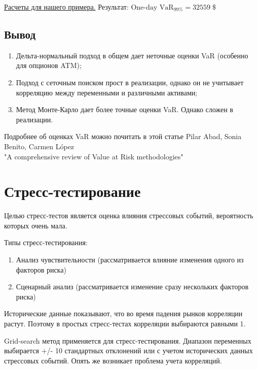 \documentclass{article}
\begin{document}
\href{https://youtu.be/ev2jSbH9G9U?t=3379}{Расчеты для нашего примера.} Результат: $\text{One-day } \text{VaR}_{99\%} = 32559 \;\$ $
\subsection{Вывод}
\begin{enumerate}
\item
Дельта-нормальный подход в общем дает
неточные оценки VaR (особенно для
опционов ATM);
\item
Подход с сеточным поиском прост в реализации,
однако он не учитывает корреляцию
между переменными и различными активами;
\item
Метод Монте-Карло дает более точные оценки
VaR. Однако сложен   в реализации.
\end{enumerate}
Подробнее об оценках VaR можно почитать в этой статье Pilar Abad, Sonia Benito, Carmen López \\"A comprehensive review of Value at Risk methodologies"  
\section{Стресс-тестирование}
Целью стресс-тестов является оценка влияния стрессовых событий, вероятность которых очень мала.

Типы стресс-тестирования:
\begin{enumerate}
\item
Анализ чувствительности (рассматривается влияние изменения одного из факторов риска) 
\item
Сценарный анализ (рассматривается изменение сразу нескольких факторов риска)
\end{enumerate}


Исторические данные показывают, что во время падения рынков корреляции растут. Поэтому в простых стресс-тестах корреляции выбираются равными 1.

Grid-search метод применяется для стресс-тестирования. Диапазон переменных выбирается +/- 10 стандартных отклонений или с учетом исторических данных стрессовых событий. Опять же возникает проблема учета корреляций.
\end{document}
